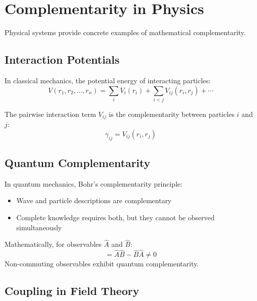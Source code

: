 \section{Complementarity in Physics}
\label{sec:physics}

Physical systems provide concrete examples of mathematical complementarity.

\subsection{Interaction Potentials}

In classical mechanics, the potential energy of interacting particles:
\begin{equation}
V(r_1, r_2, \ldots, r_n) = \sum_i V_i(r_i) + \sum_{i < j} V_{ij}(r_i, r_j) + \cdots
\end{equation}

The pairwise interaction term $V_{ij}$ is the complementarity between particles $i$ and $j$:
\begin{equation}
\gamma_{ij} = V_{ij}(r_i, r_j)
\end{equation}

\subsection{Quantum Complementarity}

In quantum mechanics, Bohr's complementarity principle:
\begin{itemize}
    \item Wave and particle descriptions are complementary
    \item Complete knowledge requires both, but they cannot be observed simultaneously
\end{itemize}

Mathematically, for observables $\hat{A}$ and $\hat{B}$:
\begin{equation}
[\hat{A}, \hat{B}] = \hat{A}\hat{B} - \hat{B}\hat{A} \neq 0
\end{equation}
Non-commuting observables exhibit quantum complementarity.

\subsection{Coupling in Field Theory}

